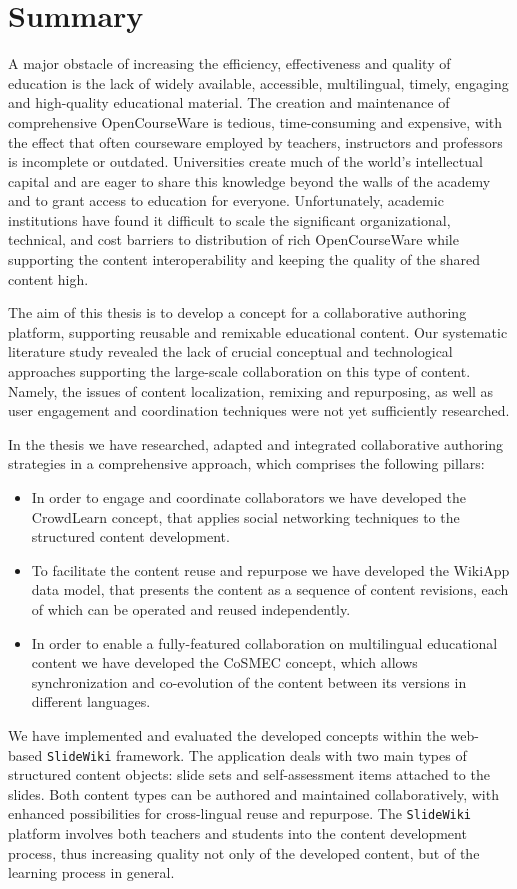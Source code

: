 \documentclass[ngerman,UKenglish,table]{scrbook}
\begin{document}

\chapter*{Summary}

A major obstacle of increasing the efficiency, effectiveness and quality of education is the lack of widely available, accessible, multilingual, timely, engaging and high-quality educational material.
The creation and maintenance of comprehensive OpenCourseWare is tedious, time-consuming and expensive, with the effect that often courseware employed by teachers, instructors and professors is incomplete or outdated.
Universities create much of the world's intellectual capital and are eager to share this knowledge beyond the walls of the academy and to grant access to education for everyone.
Unfortunately, academic institutions have found it difficult to scale the significant organizational, technical, and cost barriers to distribution of rich OpenCourseWare while supporting the content interoperability and keeping the quality of the shared content high. 

The aim of this thesis is to develop a concept for a collaborative authoring platform, supporting reusable and remixable educational content.
Our systematic literature study revealed the lack of crucial conceptual and technological approaches supporting the large-scale collaboration on this type of content.
Namely, the issues of content localization, remixing and repurposing, as well as user engagement and coordination techniques were not yet sufficiently researched.

In the thesis we have researched, adapted and integrated collaborative authoring strategies in a comprehensive approach, which comprises the following pillars:
\begin{itemize}
\item In order to engage and coordinate collaborators we have developed the CrowdLearn concept, that applies social networking techniques to the structured content development.
\item To facilitate the content reuse and repurpose we have developed the WikiApp data model, that presents the content as a sequence of content revisions, each of which can be operated and reused independently.
\item In order to enable a fully-featured collaboration on multilingual educational content we have developed the CoSMEC concept, which allows synchronization and co-evolution of the content between its versions in different languages.
\end{itemize}

We have implemented and evaluated the developed concepts within the web-based \texttt{SlideWiki} framework.
The application deals with two main types of structured content objects: slide sets and self-assessment items attached to the slides.
Both content types can be authored and maintained collaboratively, with enhanced possibilities for cross-lingual reuse and repurpose.  
The \texttt{SlideWiki} platform involves both teachers and students into the content development process, thus increasing quality not only of the developed content, but of the learning process in general.
\end{document}
